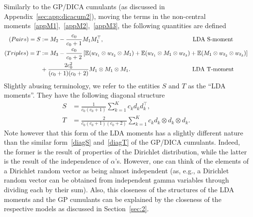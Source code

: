 \documentclass{article}
\newcommand{\sbra}[1]{\left[#1\right]}
\newcommand{\tp}{\otimes}
\newcommand{\sumk}{\sum_{k=1}^K}
\newcommand{\ga}{\alpha}
\newcommand{\ebb}{\mathbb{E}}
\begin{document}
Similarly to the GP/DICA cumulants (as discussed in Appendix~\ref{sec:app:dicacum2}), moving the terms in the non-central moments~\eqref{appM1},~\eqref{appM2},~\eqref{appM3}, the following quantities are defined
\begin{align}
\label{S:lda}
(Pairs) = S &:= M_2 - \frac{c_0}{c_0+1} M_1  M_1^{\top}, \hspace{5.3cm} \text{LDA S-moment}\\
\nonumber
(Triples) = T & := M_3 - \frac{c_0}{c_0+2} \sbra{\ebb(w_{\ell_1}\tp w_{\ell_2} \tp M_1) + \ebb(w_{\ell_1} \tp M_1 \tp w_{\ell_3}) + \ebb(M_1\tp w_{\ell_2} \tp w_{\ell_3})} \\
\label{T:lda}
& + \frac{2c_0^2}{(c_0+1)(c_0+2)} M_1\tp M_1 \tp M_1. \hspace{3.7cm} \text{LDA T-moment}
\end{align}
Slightly abusing terminology, we refer to the entities $S$ and $T$ as the ``LDA moments''. 
They have the following diagonal structure
\begin{align}
\label{diagS:lda} S &=  \frac{1}{c_0(c_0+1)} \sumk c_k d_kd_k^{\top},  \\
\label{diagT:lda} T &= \frac{2}{c_0(c_0+1)(c_0+2)} \sumk c_k d_k\tp d_k\tp d_k. 
\end{align}
Note however that this form of the LDA moments has a slightly different nature than the similar form~\eqref{diagS} and~\eqref{diagT} of the GP/DICA cumulants. Indeed, the former is the result of properties of the Dirichlet distribution, while the latter is the result of the independence of $\ga$'s. However, one can think of the elements of a Dirichlet random vector as being almost independent (as, e.g., a Dirichlet random vector can be obtained from independent gamma variables through dividing each by their sum). Also, this closeness of the structures of the LDA moments and the GP cumulants can be explained by the closeness of the respective models as discussed in Section~\ref{sec:2}.
\end{document}
